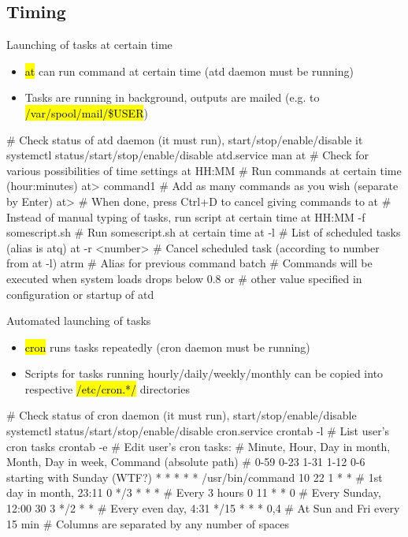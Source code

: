 \documentclass[compress, ucs, xelatex, 11pt, xcolor=svgnames,
  hyperref={
    bookmarks=true,
    unicode=true,
    colorlinks=true,
    pdftitle={Linux, command line and MetaCentrum},
    plainpages=false,
    pdfauthor={Vojtech Zeisek},
    pdfsubject={Course about use of Linux command line, writing shell scripts and using MetaCentrum of CESNET},
    pdfcreator={XeLaTeX},
    pdfkeywords={Linux, GNU, BASH, shell, command line, MetaCentrum},
    linkcolor=DarkRed,
    anchorcolor=DarkBlue,
    citecolor=Indigo,
    filecolor=NavyBlue,
    menucolor=DarkMagenta,
    urlcolor=DarkBlue,
    pdftex},
  url={hyphens, lowtilde} %
  ]{beamer}
\renewcommand{\texttt}[1]{\hl{\ttfamily #1}}
\begin{document}
\subsection{Timing}

\begin{frame}[fragile]{Launching of tasks at certain time}
  \begin{itemize}
    \item \texttt{at} can run command at certain time (atd daemon must be running)
    \item Tasks are running in background, outputs are mailed (e.g. to \texttt{/var/spool/mail/\$USER})
  \end{itemize}
  \begin{bashcode}
    # Check status of atd daemon (it must run), start/stop/enable/disable it
    systemctl status/start/stop/enable/disable atd.service
    man at # Check for various possibilities of time settings
    at HH:MM # Run commands at certain time (hour:minutes)
    at> command1 # Add as many commands as you wish (separate by Enter)
    at> # When done, press Ctrl+D to cancel giving commands to at
    # Instead of manual typing of tasks, run script at certain time
    at HH:MM -f somescript.sh # Run somescript.sh at certain time
    at -l # List of scheduled tasks (alias is atq)
    at -r <number> # Cancel scheduled task (according to number from at -l)
    atrm # Alias for previous command
    batch # Commands will be executed when system loads drops below 0.8 or
          # other value specified in configuration or startup of atd
  \end{bashcode}
\end{frame}

\begin{frame}[fragile]{Automated launching of tasks}
  \begin{itemize}
    \item \texttt{cron} runs tasks repeatedly (cron daemon must be running)
    \item Scripts for tasks running hourly/daily/weekly/monthly can be copied into respective \texttt{/etc/cron.*/} directories
  \end{itemize}
  \begin{bashcode}
    # Check status of cron daemon (it must run), start/stop/enable/disable
    systemctl status/start/stop/enable/disable cron.service
    crontab -l # List user's cron tasks
    crontab -e # Edit user's cron tasks:
    # Minute, Hour, Day in month, Month, Day in week, Command (absolute path)
    # 0-59    0-23  1-31          1-12   0-6 starting with Sunday (WTF?)
      *       *     *             *      *            /usr/bin/command
      10      22    1             *      *        # 1st day in month, 23:11
      0       */3   *             *      *        # Every 3 hours
      0       11    *             *      0        # Every Sunday, 12:00
      30      3     */2           *      *        # Every even day, 4:31
      */15    *     *             *      0,4   # At Sun and Fri every 15 min
    # Columns are separated by any number of spaces
  \end{bashcode}
\end{frame}
\end{document}
